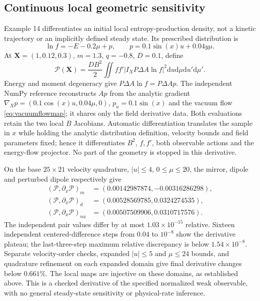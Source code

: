 \documentclass[11pt,letterpaper]{article}
\newcommand{\dd}{\mathrm d}
\newcommand{\X}{\mathbf X}
\begin{document}
\subsection*{Continuous local geometric sensitivity}
Example 14 differentiates an initial local entropy-production density, not
a kinetic trajectory or an implicitly defined steady state. Its prescribed
distribution is
\begin{equation}
 \ln f=-E-0.2\mu+p,\qquad
 p=0.1\sin(x)u+0.04y\mu.
\end{equation}
At $\X=(1,0.12,0.3)$, $m=1.3$, $q=-0.8$, $D=0.1$, define
\begin{equation}
 \mathcal P(\X)=\frac{DB^2}{2}
 \iint ff'\left|I_XP\Delta A\ln f\right|^2
 \dd u\dd\mu\dd u'\dd\mu'.
 \label{eq:localproductionderivative}
\end{equation}
Energy and moment degeneracy give
$P\Delta A\ln f=P\Delta Ap$. The independent NumPy reference reconstructs
$A p$ from the analytic gradient
$\nabla_Xp=(0.1\cos(x)u,0.04\mu,0)$, $p_u=0.1\sin(x)$ and the vacuum
flow \eqref{eq:vacuumflowmap}; it shares only the field derivative data.
Both evaluations retain the two local $B$ Jacobians. Automatic
differentiation translates the sample in $x$ while holding the analytic
distribution definition, velocity bounds and field parameters fixed; hence
it differentiates $B^2$, $f,f'$, both observable actions and the energy-flow
projector. No part of the geometry is stopped in this derivative.

On the base $25\times21$ velocity quadrature, $|u|\le4$, $0\le\mu\le20$,
the mirror, dipole and perturbed dipole respectively give
\begin{align}
 (\mathcal P,\partial_x\mathcal P)_m
   &=(0.00142987874,-0.00316286298),\\
 (\mathcal P,\partial_x\mathcal P)_d
   &=(0.00528569785,0.0324274535),\\
 (\mathcal P,\partial_x\mathcal P)_{na}
   &=(0.00507509906,0.0310717576).
\end{align}
The independent pair values differ by at most $1.03\times10^{-15}$ relative.
Sixteen independent centered-difference steps from $0.04$ to $10^{-8}$
show the derivative plateau; the last-three-step maximum relative discrepancy
is below $1.54\times10^{-8}$. Separate velocity-order checks, expanded
$|u|\le5$ and $\mu\le24$ bounds, and quadrature refinement on each expanded
domain give final derivative changes below $0.661\%$.
The local maps are injective on these domains, as established above.
This is a checked derivative of the specified normalized weak observable,
with no general steady-state sensitivity or physical-rate inference.
\end{document}
